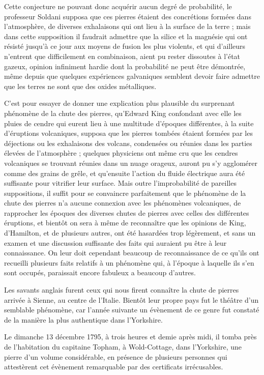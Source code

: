 \documentclass[a4paper, 12pt, oneside, french]{article}
\begin{document}
Cette conjecture ne pouvant donc acquérir aucun degré de probabilité, le professeur Soldani supposa que ces pierres étaient des concrétions formées dans l'atmosphère, de diverses exhalaisons qui ont lieu à la surface de la terre ; mais dans cette supposition il faudrait admettre que la silice et la magnésie qui ont résisté jusqu'à ce jour aux moyens de fusion les plus violents, et qui d'ailleurs n'entrent que difficilement en combinaison, aient pu rester dissoutes à l'état gazeux, opinion infiniment hardie dont la probabilité ne peut être démontrée, même depuis que quelques expériences galvaniques semblent devoir faire admettre que les terres ne sont que des oxides métalliques.

C'est pour essayer de donner une explication plus plausible du surprenant phénomène de la chute des pierres, qu'Edward King confondant avec elle les pluies de cendre qui eurent lieu à une multitude d'époques différentes, à la suite d'éruptions volcaniques, supposa que les pierres tombées étaient formées par les déjections ou les exhalaisons des volcans, condensées ou réunies dans les parties élevées de l'atmosphère ; quelques physiciens ont même cru que les cendres volcaniques se trouvant réunies dans un nuage orageux, auront pu s'y agglomérer comme des grains de grêle, et qu'ensuite l'action du fluide électrique aura été suffisante pour vitrifier leur surface. Mais outre l'improbabilité de pareilles suppositions, il suffit pour se convaincre parfaitement que le phénomène de la chute des pierres n'a aucune connexion avec les phénomènes volcaniques, de rapprocher les époques des diverses chutes de pierres avec celles des différentes éruptions, et bientôt on sera à même de reconnaître que les opinions de King, d'Hamilton, et de plusieurs autres, ont été hasardées trop légèrement, et sans un examen et une discussion suffisante des faits qui auraient pu être à leur connaissance. On leur doit cependant beaucoup de reconnaissance de ce qu'ils ont recueilli plusieurs faits relatifs à un phénomène qui, à l'époque à laquelle ils s'en sont occupés, paraissait encore fabuleux a beaucoup d'autres.

Les savants anglais furent ceux qui nous firent connaître la chute de pierres arrivée à Sienne, au centre de l'Italie. Bientôt leur propre pays fut le théâtre d'un semblable phénomène, car l'année suivante un évènement de ce genre fut constaté de la manière la plus authentique dans l'Yorkshire.

Le dimanche 13 décembre 1795, à trois heures et demie après midi, il tomba près de l'habitation du capitaine Topham, à Wold-Cottage, dans l'Yorkshire, une pierre d'un volume considérable, en présence de plusieurs personnes qui attestèrent cet évènement remarquable par des certificats irrécusables.
\end{document}
